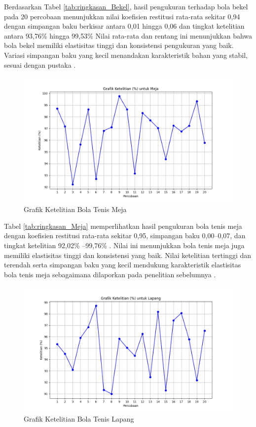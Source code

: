 Berdasarkan Tabel \ref{tab:ringkasan_Bekel}, hasil pengukuran terhadap bola bekel pada 20 percobaan menunjukkan nilai koefisien restitusi rata-rata sekitar 0,94 dengan simpangan baku berkisar antara 0,01 hingga 0,06 dan tingkat ketelitian antara 93,76\% hingga 99,53\%  Nilai rata-rata dan rentang ini menunjukkan bahwa bola bekel memiliki elastisitas tinggi dan konsistensi pengukuran yang baik. Variasi simpangan baku yang kecil menandakan karakteristik bahan yang stabil, sesuai dengan pustaka \citep{garcia2021elastic, patel2021coefficient}.

\begin{figure}[!htbp]
    \centering
    \includegraphics[width=0.5\linewidth]{output_tex/Grafik_ketelitian_Meja.png}
    \caption{Grafik Ketelitian Bola Tenis Meja}
    \label{fig:grafik-bola-tenis-meja}
\end{figure}
\newpage


Tabel \ref{tab:ringkasan_Meja} memperlihatkan hasil pengukuran bola tenis meja dengan koefisien restitusi rata-rata sekitar 0,95, simpangan baku 0,00--0,07, dan tingkat ketelitian 92,02\% --99,76\% . Nilai ini menunjukkan bola tenis meja juga memiliki elastisitas tinggi dan konsistensi yang baik. Nilai ketelitian tertinggi dan terendah serta simpangan baku yang kecil mendukung karakteristik elastisitas bola tenis meja sebagaimana dilaporkan pada penelitian sebelumnya \citep{izzuddin2015menentukan, stefano2020elastic}.

\begin{figure}[!htbp]
    \centering
    \includegraphics[width=0.5\linewidth]{output_tex/Grafik_ketelitian_Lapang.png}
    \caption{Grafik Ketelitian Bola Tenis Lapang}
    \label{fig:grafik-bola-tenis-lapang}
\end{figure}
\newpage



